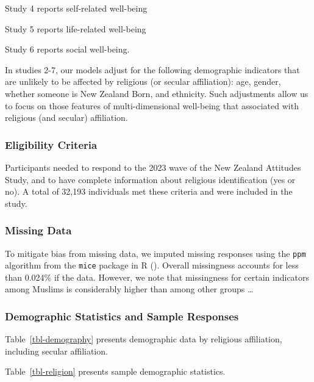 \documentclass[
  single column]{article}
\begin{document}
Study 4 reports self-related well-being

Study 5 reports life-related well-being

Study 6 reports social well-being.

In studies 2-7, our models adjust for the following demographic
indicators that are unlikely to be affected by religious (or secular
affiliation): age, gender, whether someone is New Zealand Born, and
ethnicity. Such adjustments allow us to focus on those features of
multi-dimensional well-being that associated with religious (and
secular) affiliation.

\subsubsection{Eligibility Criteria}\label{eligibility-criteria}

Participants needed to respond to the 2023 wave of the New Zealand
Attitudes Study, and to have complete information about religious
identification (yes or no). A total of 32,193 individuals met these
criteria and were included in the study.

\subsubsection{Missing Data}\label{missing-data}

To mitigate bias from missing data, we imputed missing responses using
the \texttt{ppm} algorithm from the \texttt{mice} package in R
(). Overall missingness
accounts for less than 0.024\% if the data. However, we note that
missingness for certain indicators among Muslims is considerably higher
than among other groups \ldots{}

\subsubsection{Demographic Statistics and Sample
Responses}\label{demographic-statistics-and-sample-responses}

Table~\ref{tbl-demography} presents demographic data by religious
affiliation, including secular affiliation.

Table~\ref{tbl-religion} presents sample demographic statistics.
\end{document}
